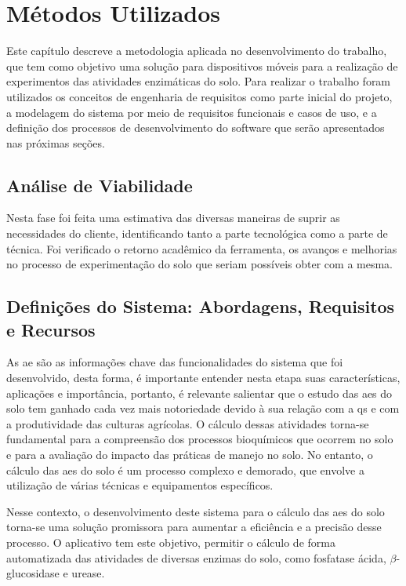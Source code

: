 \chapter{Métodos Utilizados}\label{ch:metodos}
Este capítulo descreve a metodologia aplicada no desenvolvimento do trabalho, que tem como objetivo uma solução para dispositivos móveis para a realização de experimentos das atividades enzimáticas do solo. Para realizar o trabalho foram utilizados os conceitos de engenharia de requisitos como parte inicial do projeto, a modelagem do sistema por meio de requisitos funcionais e casos de uso, e a definição dos processos de desenvolvimento do software que serão apresentados nas próximas seções.

\section{Análise de Viabilidade}\label{sec:analise_viabilidade}
Nesta fase foi feita uma estimativa das diversas maneiras de suprir as necessidades do cliente, identificando tanto a parte tecnológica como a parte de técnica. Foi verificado o retorno acadêmico da ferramenta, os avanços e melhorias no processo de experimentação do solo que seriam possíveis obter com a mesma.

\section{Definições do Sistema: Abordagens, Requisitos e Recursos}\label{sec:eng_sys}
As \ac{ae} são as informações chave das funcionalidades do sistema que foi desenvolvido, desta forma, é importante entender nesta etapa suas características, aplicações e importância, portanto, é relevante salientar que o estudo das \acp{ae} do solo tem ganhado cada vez mais notoriedade devido à sua relação com a \ac{qs} e com a produtividade das culturas agrícolas. O cálculo dessas atividades torna-se fundamental para a compreensão dos processos bioquímicos que ocorrem no solo e para a avaliação do impacto das práticas de manejo no solo. No entanto, o cálculo das \acp{ae} do solo é um processo complexo e demorado, que envolve a utilização de várias técnicas e equipamentos específicos.

Nesse contexto, o desenvolvimento deste sistema para o cálculo das \acp{ae} do solo torna-se uma solução promissora para aumentar a eficiência e a precisão desse processo. O aplicativo tem este objetivo, permitir o cálculo de forma automatizada das atividades de diversas enzimas do solo, como fosfatase ácida, $\beta$-glucosidase e urease.

